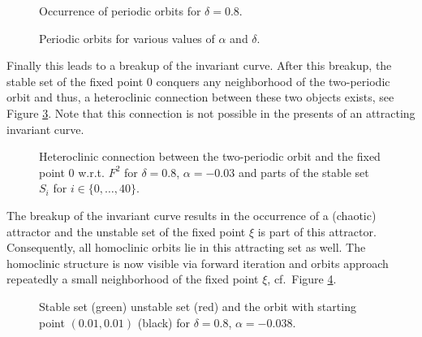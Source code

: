 \begin{figure}[H]
\begin{center}
\end{center}
\caption{Occurrence of periodic orbits for $\delta = 0.8$.\label{F8}} 
\end{figure}

\begin{figure}[H]
\begin{center}
\end{center}
\caption{Periodic orbits for various values of $\alpha$ and
  $\delta$.\label{F9}}  
\end{figure}




Finally this leads to a breakup of the invariant curve.
After this breakup, the stable set of the fixed point $0$ conquers any
neighborhood of the two-periodic orbit and thus, a heteroclinic
connection between these two objects exists, see Figure \ref{F16}.
Note that this connection is not possible in the presents of an
attracting invariant curve. 

\begin{figure}[H]
\begin{center}
\end{center}
\caption{Heteroclinic connection between the
  two-periodic orbit and 
  the fixed point $0$ w.r.t. $F^2$ for $\delta = 0.8$, $\alpha =
  -0.03$ and parts of the stable set $S_i$ for $i \in \{0,\dots,
  40\}$.\label{F16}}    
\end{figure}

The breakup of the invariant curve results in the occurrence  of a (chaotic)
attractor and the unstable set of the fixed point $\xi$
is part of this attractor. Consequently, all homoclinic
orbits lie in this attracting set as well. 
The homoclinic structure is now visible via forward iteration
and orbits approach repeatedly a small neighborhood of the fixed
point $\xi$, cf.\ Figure \ref{F15}.

\begin{figure}[H]
\begin{center}
\end{center}
\caption{Stable set (green) unstable set (red) and the orbit with
  starting point $(0.01, 0.01)$ (black) for $\delta = 0.8$, $\alpha =
  -0.038$. \label{F15}} 
\end{figure}


